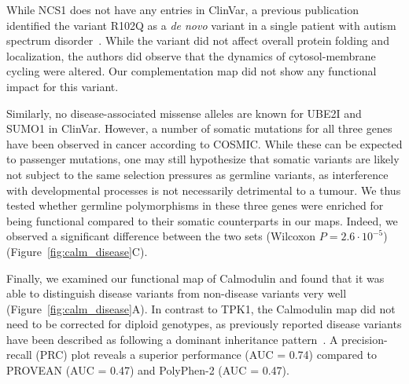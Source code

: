 While NCS1 does not have any entries in ClinVar, a previous publication identified the variant R102Q as a \textit{de novo} variant in a single patient with autism spectrum disorder~\cite{handley_structural_2010}. While the variant did not affect overall protein folding and localization, the authors did observe that the dynamics of cytosol-membrane cycling were altered. Our complementation map did not show any functional impact for this variant.

Similarly, no disease-associated missense alleles are known for UBE2I and SUMO1 in ClinVar. However, a number of somatic mutations for all three genes have been observed in cancer according to COSMIC. While these can be expected to passenger mutations, one may still hypothesize that somatic variants are likely not subject to the same selection pressures as germline variants, as interference with developmental processes is not necessarily detrimental to a tumour. We thus tested whether germline polymorphisms in these three genes were enriched for being functional compared to their somatic counterparts in our maps. Indeed, we observed a significant difference between the two sets (Wilcoxon $P = 2.6 \cdot 10^{-5}$) (Figure~\ref{fig:calm_disease}C).

Finally, we examined our functional map of Calmodulin and found that it was able to distinguish disease variants from non-disease variants very well (Figure~\ref{fig:calm_disease}A). In contrast to TPK1, the Calmodulin map did not need to be corrected for diploid genotypes, as previously reported disease variants have been described as following a dominant inheritance pattern~\cite{crotti_calmodulin_2013}. A precision-recall (PRC) plot reveals a superior performance (AUC = 0.74) compared to PROVEAN (AUC = 0.47) and PolyPhen-2 (AUC = 0.47).  


